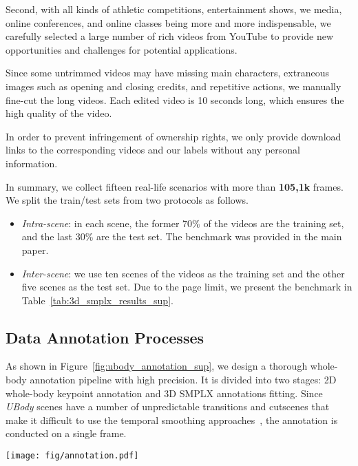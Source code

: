 \documentclass[10pt,twocolumn,letterpaper]{article}
\newcommand{\dataname}{\emph{UBody}\xspace}
\begin{document}
Second, with all kinds of athletic competitions, entertainment shows, we media, online conferences, and online classes being more and more indispensable, we carefully selected a large number of rich videos from YouTube to provide new opportunities and challenges for potential applications. 

Since some untrimmed videos may have missing main characters, extraneous images such as opening and closing credits, and repetitive actions, we manually fine-cut the long videos. Each edited video is 10 seconds long, which ensures the high quality of the video.

In order to prevent infringement of ownership rights, we only provide download links to the corresponding videos and our labels without any personal information.

In summary, we collect fifteen real-life scenarios with more than \textbf{105,1k} frames. 
We split the train/test sets from two protocols as follows. 
\begin{itemize}
\item
\emph{Intra-scene}: in each scene, the former 70\% of the videos are the training set, and the last 30\% are the test set. The benchmark was provided in the main paper.
\item
\emph{Inter-scene}: we use ten scenes of the videos as the training set and the other five scenes as the test set. Due to the page limit, we present the benchmark in Table~\ref{tab:3d_smplx_results_sup}.
\end{itemize}

\subsection{Data Annotation Processes}
\label{sec:ubody_annotation}

As shown in Figure~\ref{fig:ubody_annotation_sup}, we design a thorough whole-body annotation pipeline with high precision. It is divided into two stages: 2D whole-body keypoint annotation and 3D SMPLX annotations fitting.
Since \dataname scenes have a number of unpredictable transitions and cutscenes that make it difficult to use the temporal smoothing approaches~\cite{young1995gaus1d,press1990savitzky,zeng2022smoothnet}, the annotation is conducted on a single frame.

\begin{figure*}[h]
\centering
\texttt{[image: fig/annotation.pdf]}
\vspace{-0.5cm}
\caption{
Illustration of the annotation pipeline of \dataname. Black lines show the annotation process of 2D whole-body keypoints, and blue lines are the 3D SMPL-X annotation procedure. Red dotted lines mean to update the information.
}
\label{fig:ubody_annotation_sup}
\vspace{-0.3cm}
\end{figure*}
\end{document}
